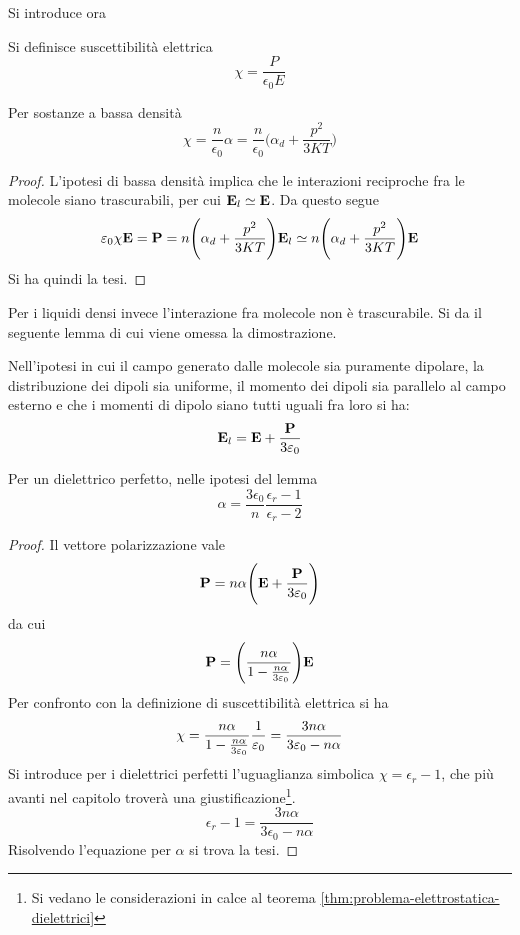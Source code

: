 Si introduce ora
\begin{defn}
    Si definisce suscettibilità elettrica
    \[
        \chi=\frac {P}{\epsilon_0E}
    \]
\end{defn}

\begin{obs}
    Per sostanze a bassa densità
    \[
        \chi=\frac{n}{\epsilon_0}\alpha=\frac{n}{\epsilon_0}\Biggl(\alpha_d+\frac{p^2}{3KT}\Biggr)
    \]
\end{obs}
\begin{proof}
    L'ipotesi di bassa densità implica che le interazioni reciproche fra le molecole siano trascurabili, per cui $\vb{E}_l\simeq\vb{E}$. Da questo segue
    \[
        \varepsilon_0\chi\vb{E}=\vb{P}=n\Biggl(\alpha_d+\frac{p^2}{3KT}\Biggr)\vb{E}_l \simeq n\Biggl(\alpha_d+\frac{p^2}{3KT}\Biggr)\vb{E}
    \]
    Si ha quindi la tesi.
\end{proof}

Per i liquidi densi invece l'interazione fra molecole non è trascurabile. Si da il seguente lemma di cui viene omessa la dimostrazione.
\begin{lemma}
    Nell'ipotesi in cui il campo generato dalle molecole sia puramente dipolare, la distribuzione dei dipoli sia uniforme,
    il momento dei dipoli sia parallelo al campo esterno e che i momenti di dipolo siano tutti uguali fra loro si ha:
    \[
        \vb{E}_l=\vb{E}+\frac{\vb{P}}{3\varepsilon_0}
    \]
\end{lemma}

\begin{thm}
    Per un dielettrico perfetto, nelle ipotesi del lemma
    \[
        \alpha=\frac{3\epsilon_0}{n}\frac{\epsilon_r-1}{\epsilon_r-2}
    \]
\end{thm}
\begin{proof}
    Il vettore polarizzazione vale
    \[
        \vb{P}=n\alpha\Biggl(\vb{E}+\frac{\vb{P}}{3\varepsilon_0}\Biggr)
    \]
    da cui
    \[
        \vb{P}=\Biggl(\frac{n\alpha}{1-\frac{n\alpha}{3\varepsilon_0}}\Biggr)\vb{E}
    \]
    Per confronto con la definizione di suscettibilità elettrica si ha
    \[
        \chi=\frac{n\alpha}{1-\frac{n\alpha}{3\varepsilon_0}}\frac{1}{\varepsilon_0}=\frac{3n\alpha}{3\varepsilon_0-n\alpha}
    \]
    Si introduce per i dielettrici perfetti l'uguaglianza simbolica $\chi=\epsilon_r-1$,
    che più avanti nel capitolo troverà una giustificazione\footnote{Si vedano le considerazioni in calce
    al teorema \ref{thm:problema-elettrostatica-dielettrici}}.
    \[
        \epsilon_r-1=\frac{3n\alpha}{3\epsilon_0-n\alpha}
    \]
    Risolvendo l'equazione per $\alpha$ si trova la tesi.

\end{proof}
